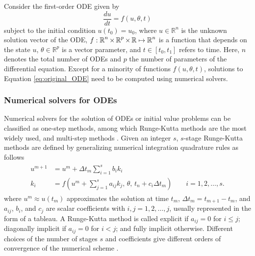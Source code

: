 Consider the first-order ODE given by
\begin{equation}
 \frac{du}{dt} = f(u, \theta, t)
 \label{eq:original_ODE}
\end{equation}
subject to the initial condition $u(t_0) = u_0$, where $u \in \mathbb{R}^n$ is the unknown solution vector of the ODE, $f: \operatorname{\mathbb{R}}^n \times \operatorname{\mathbb{R}}^p \times \operatorname{\mathbb{R}} \mapsto \operatorname{\mathbb{R}}^n$ is a function that depends on the state $u$, $\theta \in \mathbb R^p$ is a vector parameter, and $t \in [t_0, t_1]$ refers to time.
Here, $n$ denotes the total number of ODEs and $p$ the number of parameters of the differential equation.
Except for a minority of functions $f(u,\theta, t)$, solutions to Equation \eqref{eq:original_ODE} need to be computed using numerical solvers. 

\subsubsection{Numerical solvers for ODEs}
\label{section:intro-numerical-solvers}

Numerical solvers for the solution of ODEs or initial value problems can be classified as one-step methods, among which Runge-Kutta methods are the most widely used, and multi-step methods \cite{hairer-solving-1}.
Given an integer $s$, $s$-stage Runge-Kutta methods are defined by generalizing numerical integration quadrature rules as follows
\begin{align}
\begin{split}
    u^{m+1} 
    &= 
    u^m 
    + 
    \Delta t_m \sum_{i=1}^s b_i k_i \\
    k_i 
    &= 
    f \left(u^m + \sum_{j=1}^s a_{ij} k_j , \, \theta , \, t_n + c_i \Delta t_m \right) \qquad i=1,2, \ldots, s.
    \label{eq:Runge-Kutta-scheme}
\end{split}
\end{align}
where $u^{m} \approx u(t_m)$ approximates the solution at time $t_m$, $\Delta t_m = t_{m+1}-t_m$, and $a_{ij}$, $b_i$, and $c_j$ are scalar coefficients with $i,j=1, 2,\ldots, j$, usually represented in the form of a tableau. 
A Runge-Kutta method is called explicit if $a_{ij}=0$ for $i \leq j$; diagonally implicit if $a_{ij}=0$ for $i < j$; and fully implicit otherwise. 
Different choices of the number of stages $s$ and coefficients give different orders of convergence of the numerical scheme \cite{Butcher_Wanner_1996, Butcher_2001}. 

